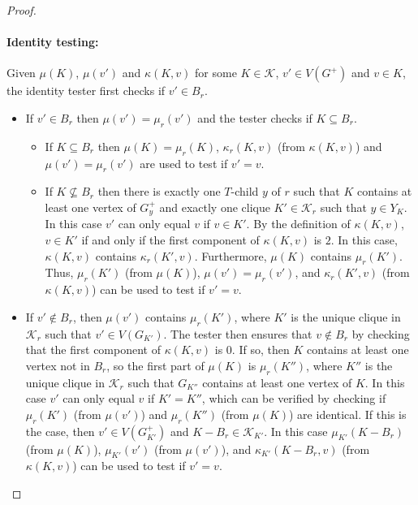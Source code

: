 \documentclass{patmorin}
\begin{document}
\begin{proof}
    \paragraph{Identity testing:}
  Given $\mu(K)$, $\mu(v')$ and $\kappa(K,v)$ for some $K\in\mathcal{K}$, $v'\in V(G^+)$ and $v\in K$, the identity tester first checks if $v'\in B_r$.
  \begin{itemize}
      \item If $v'\in B_r$ then $\mu(v')=\mu_r(v')$ and the tester checks if $K\subseteq B_r$.
      \begin{itemize}
          \item If $K\subseteq B_r$ then $\mu(K)=\mu_r(K)$, $\kappa_r(K,v)$ (from $\kappa(K,v)$) and $\mu(v')=\mu_r(v')$ are used to test if $v'=v$.
          \item If $K\not\subseteq B_r$ then there is exactly one $T$-child $y$ of $r$ such that $K$ contains at least one vertex of $G^+_y$ and exactly one clique $K'\in\mathcal{K}_r$ such that $y\in Y_K$.
          In this case $v'$ can only equal $v$ if $v\in K'$.
          By the definition of $\kappa(K,v)$, $v\in K'$ if and only if the first component of $\kappa(K,v)$ is $2$.
          In this case, $\kappa(K,v)$ contains $\kappa_r(K',v)$.  Furthermore, $\mu(K)$ contains $\mu_r(K')$.
          Thus, $\mu_r(K')$ (from $\mu(K)$), $\mu(v')=\mu_r(v')$, and $\kappa_r(K',v)$ (from $\kappa(K,v)$) can be used to test if $v'=v$.
      \end{itemize}
      \item If $v'\not\in B_r$, then $\mu(v')$ contains $\mu_r(K')$, where $K'$ is the unique clique in $\mathcal{K}_r$ such that $v'\in V(G_{K'})$.
      The tester then ensures that $v\not\in B_r$ by checking that the first component of $\kappa(K,v)$ is $0$.
      If so, then $K$ contains at least one vertex not in $B_r$, so the first part of $\mu(K)$ is $\mu_r(K'')$, where $K''$ is the unique clique in $\mathcal{K}_r$ such that $G_{K''}$ contains at least one vertex of $K$.
      In this case $v'$ can only equal $v$ if $K'=K''$, which can be verified by checking if $\mu_r(K')$ (from $\mu(v')$) and $\mu_r(K'')$ (from $\mu(K)$) are identical.
      If this is the case, then $v'\in V(G^+_{K'})$ and $K-B_r\in\mathcal{K}_{K'}$.
      In this case $\mu_{K'}(K-B_r)$ (from $\mu(K)$), $\mu_{K'}(v')$ (from $\mu(v')$), and $\kappa_{K'}(K-B_r, v)$ (from $\kappa(K,v)$) can be used to test if $v'=v$. \qedhere
  \end{itemize}
  \end{proof}
\end{document}
